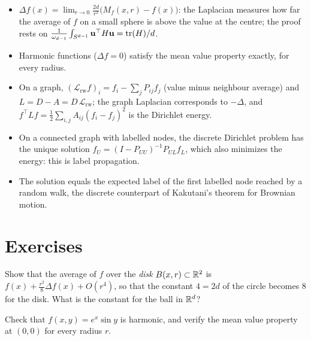 \begin{notechapter}
\begin{chaptersummary}
\begin{itemize}
  \item $\Delta f(x) = \lim_{r\to0}\frac{2d}{r^2}\bigl(M_f(x, r) - f(x)\bigr)$: the Laplacian measures how far the average of $f$ on a small sphere is
        above the value at the centre; the proof rests on $\frac1{\omega_{d-1}}\int_{S^{d-1}}\mathbf u^\top H\mathbf u = \operatorname{tr}(H)/d$.
  \item Harmonic functions ($\Delta f = 0$) satisfy the mean value property exactly, for every radius.
  \item On a graph, $(\mathcal L_{\mathrm{rw}}f)_i = f_i - \sum_jP_{ij}f_j$ (value minus neighbour average) and $L = D - A = D\,\mathcal L_{\mathrm{rw}}$; the graph Laplacian
        corresponds to $-\Delta$, and $f^\top Lf = \frac12\sum_{i,j}A_{ij}(f_i - f_j)^2$ is the Dirichlet energy.
  \item On a connected graph with labelled nodes, the discrete Dirichlet problem has the unique
        solution $f_U = (I - P_{UU})^{-1}P_{UL}f_L$, which also minimizes the energy: this is label propagation.
  \item The solution equals the expected label of the first labelled node reached by a random walk,
        the discrete counterpart of Kakutani's theorem for Brownian motion.
\end{itemize}
\end{chaptersummary}

\section*{Exercises}

\begin{exercise}\label{harmonic-functions:exr:1}
Show that the average of $f$ over the \emph{disk} $B(x, r)\subset\mathbb{R}^2$ is $f(x) + \frac{r^2}8\Delta f(x) + O(r^4)$, so that the constant $4 = 2d$ of the
circle becomes $8$ for the disk. What is the constant for the ball in $\mathbb{R}^d$?
\end{exercise}

\begin{exercise}\label{harmonic-functions:exr:2}
Check that $f(x, y) = e^x\sin y$ is harmonic, and verify the mean value property at $(0, 0)$ for every
radius $r$.
\end{exercise}


\end{notechapter}
